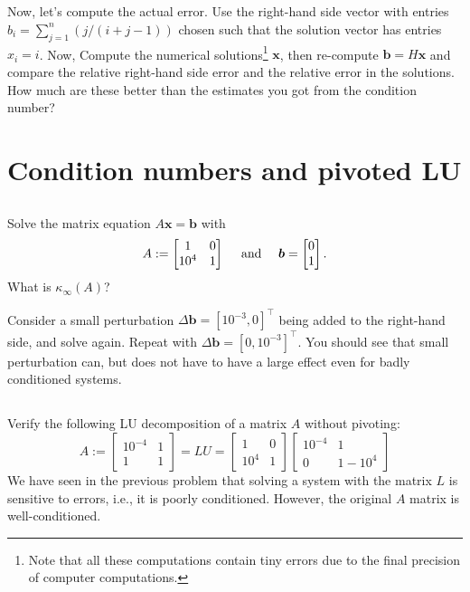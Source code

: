 \documentclass[11pt,letterpaper]{report}
\begin{document}
\subsection{}
  Now, let's compute the actual error. Use the right-hand side vector
  with entries $b_i = \sum_{j=1}^n(j/(i+j-1))$ chosen such that the
  solution vector has entries $x_i=i$. Now, Compute the numerical
  solutions\footnote{Note that all these computations contain tiny
    errors due to the final precision of computer computations.}
  $\boldsymbol x$, then re-compute $\boldsymbol b=H\boldsymbol x$ and
  compare the relative right-hand side error and the relative error
  in the solutions. How much are these better than the estimates you
  got from the condition number?
  
\section{Condition numbers and pivoted LU}
\subsection{}
Solve the matrix equation $A\boldsymbol x = \boldsymbol b$ with 
\begin{align*}
  A:=
  \begin{bmatrix}
    1       & 0  \\
    10^{4}  & 1
  \end{bmatrix}
  \quad \mbox{ and } \quad
  \boldsymbol b = \begin{bmatrix}
  0\\1
  \end{bmatrix}.
\end{align*}
What is $\kappa_\infty(A)$?

Consider a small perturbation $\Delta \boldsymbol b=[10^{-3},0]^\top$ being added to the right-hand side, and solve again. Repeat with $\Delta \boldsymbol b =[0,10^{-3}]^\top$. You should see that small perturbation can, but does not have to have a large effect even for badly conditioned systems.

\subsection{}
Verify the following LU decomposition of a matrix $A$ without pivoting:
  $$
  A := \begin{bmatrix} 10^{-4} & 1\\ 1 & 1
  \end{bmatrix} = LU =
  \begin{bmatrix} 1 & 0\\ 10^4 & 1
  \end{bmatrix}
  \begin{bmatrix} 10^{-4} & 1\\ 0 & 1-10^4
  \end{bmatrix}
  $$ 
We have seen in the previous problem that solving a system with the matrix $L$ is sensitive to errors, i.e., it is poorly conditioned. However, the original $A$ matrix is well-conditioned.
\end{document}
